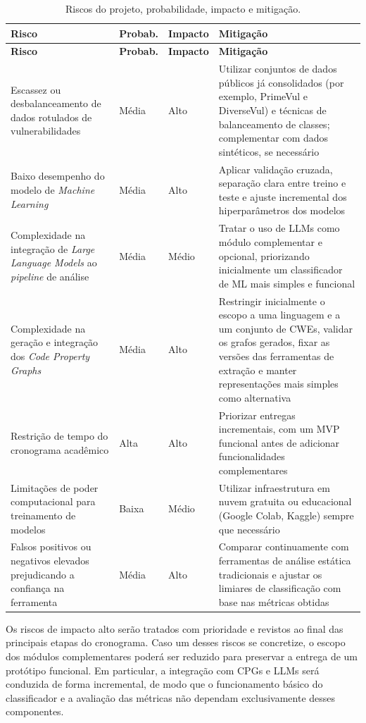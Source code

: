 \footnotesize
\begin{longtable}{@{}p{4.3cm}p{1.6cm}p{1.5cm}p{6.5cm}@{}}
\caption{Riscos do projeto, probabilidade, impacto e mitigação.}
\label{tab:riscos} \\
\toprule
\textbf{Risco} & \textbf{Probab.} & \textbf{Impacto} & \textbf{Mitigação} \\
\midrule
\endfirsthead
\toprule
\textbf{Risco} & \textbf{Probab.} & \textbf{Impacto} & \textbf{Mitigação} \\
\midrule
\endhead
Escassez ou desbalanceamento de dados rotulados de vulnerabilidades &
Média & Alto &
Utilizar conjuntos de dados públicos já consolidados (por exemplo,
PrimeVul e DiverseVul) e técnicas de balanceamento de classes;
complementar com dados sintéticos, se necessário \\
Baixo desempenho do modelo de \textit{Machine Learning} &
Média & Alto &
Aplicar validação cruzada, separação clara entre treino e teste e
ajuste incremental dos hiperparâmetros dos modelos \\
Complexidade na integração de \textit{Large Language Models} ao
\textit{pipeline} de análise &
Média & Médio &
Tratar o uso de LLMs como módulo complementar e opcional, priorizando
inicialmente um classificador de ML mais simples e funcional \\
Complexidade na geração e integração dos \textit{Code Property Graphs} &
Média & Alto &
Restringir inicialmente o escopo a uma linguagem e a um conjunto de
CWEs, validar os grafos gerados, fixar as versões das ferramentas de
extração e manter representações mais simples como alternativa \\
Restrição de tempo do cronograma acadêmico &
Alta & Alto &
Priorizar entregas incrementais, com um MVP funcional antes de
adicionar funcionalidades complementares \\
Limitações de poder computacional para treinamento de modelos &
Baixa & Médio &
Utilizar infraestrutura em nuvem gratuita ou educacional (Google
Colab, Kaggle) sempre que necessário \\
Falsos positivos ou negativos elevados prejudicando a confiança na
ferramenta &
Média & Alto &
Comparar continuamente com ferramentas de análise estática
tradicionais e ajustar os limiares de classificação com base nas
métricas obtidas \\
\bottomrule
\end{longtable}
\normalsize

Os riscos de impacto alto serão tratados com prioridade e revistos ao
final das principais etapas do cronograma. Caso um desses riscos se
concretize, o escopo dos módulos complementares poderá ser reduzido para
preservar a entrega de um protótipo funcional. Em particular, a
integração com CPGs e LLMs será conduzida de forma incremental, de modo
que o funcionamento básico do classificador e a avaliação das métricas
não dependam exclusivamente desses componentes.
